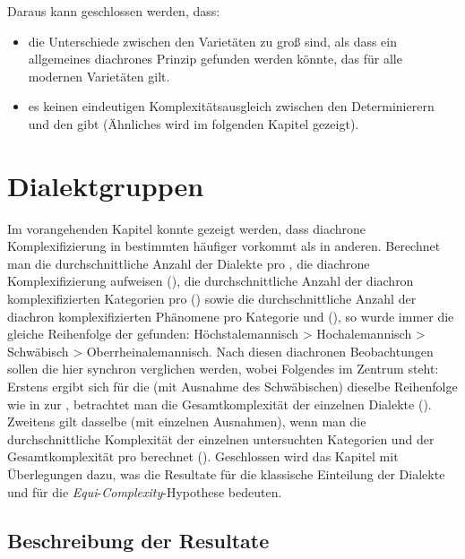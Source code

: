 \noindent
Daraus kann geschlossen werden, dass:

\begin{itemize}
\item
die Unterschiede zwischen den Varietäten zu groß sind, als dass ein allgemeines diachrones Prinzip gefunden werden könnte, das für alle modernen Varietäten gilt.
\item
es keinen eindeutigen Komplexitätsausgleich zwischen den Determinierern und den  gibt (Ähnliches wird im folgenden Kapitel gezeigt).
\end{itemize}

\section{Dialektgruppen}\label{6.2}

Im vorangehenden Kapitel konnte gezeigt werden, dass diachrone Komplexifizierung in bestimmten  häufiger vorkommt als in anderen. Berechnet man die durchschnittliche Anzahl der Dialekte pro , die diachrone Komplexifizierung aufweisen (), die durchschnittliche Anzahl der diachron komplexifizierten Kategorien pro  () sowie die durchschnittliche Anzahl der diachron komplexifizierten Phänomene pro Kategorie und  (), so wurde immer die gleiche Reihenfolge der  gefunden: Höchstalemannisch > Hochalemannisch > Schwäbisch > Oberrheinalemannisch. Nach diesen diachronen Beobachtungen sollen die  hier synchron verglichen werden, wobei Folgendes im Zentrum steht: Erstens ergibt sich für die  (mit Ausnahme des Schwäbischen) dieselbe Reihenfolge  wie in  zur , betrachtet man die Gesamtkomplexität der einzelnen Dialekte (). Zweitens gilt dasselbe (mit einzelnen Ausnahmen), wenn man die durchschnittliche Komplexität der einzelnen untersuchten Kategorien und der Gesamtkomplexität pro  berechnet (). Geschlossen wird das Kapitel mit Überlegungen dazu, was die Resultate für die klassische Einteilung der Dialekte und für die \textit{Equi}{}-\textit{Complexity}{}-Hypothese bedeuten.

\subsection{Beschreibung der Resultate}\label{6.2.1}

